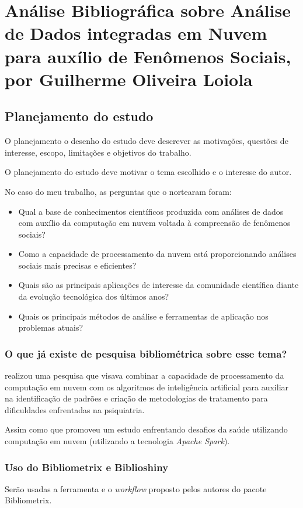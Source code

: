 \chapter{Análise Bibliográfica sobre Análise de Dados integradas em Nuvem para auxílio de Fenômenos Sociais, por Guilherme Oliveira Loiola\label{chap:bibliometria:guioliunb}}

\section{Planejamento do estudo\label{MASSA:coleta}}
O planejamento o  desenho do estudo deve descrever as motivações, questões de interesse, escopo, limitações e objetivos do trabalho.

O planejamento do estudo deve motivar o tema escolhido e o interesse do autor.

No caso do meu trabalho, as perguntas que o nortearam foram:
\begin{itemize}
    \item Qual a base de conhecimentos científicos produzida com análises de dados com auxílio da computação em nuvem voltada à compreensão de fenômenos sociais? 
    \item Como a capacidade de processamento da nuvem está proporcionando análises sociais mais precisas e eficientes? 
    \item Quais são as principais aplicações de interesse da comunidade científica diante da evolução tecnológica dos últimos anos?
    \item Quais os principais métodos de análise e ferramentas de aplicação nos problemas atuais?
\end{itemize}

\subsection{O que já existe de pesquisa bibliométrica sobre esse tema?}

\cite{ma_method_2020} realizou uma pesquisa que visava combinar a capacidade de processamento da computação em nuvem com os algoritmos de inteligência artificial para auxiliar na identificação de padrões e criação de metodologias de tratamento para dificuldades enfrentadas na psiquiatria.

Assim como \cite{archenaa_interactive_2016} que promoveu um estudo enfrentando desafios da saúde utilizando computação em nuvem (utilizando a tecnologia \textit{Apache Spark}).


\subsection{Uso do Bibliometrix e Biblioshiny}
Serão usadas a ferramenta e o \textit{workflow} proposto pelos autores do pacote Bibliometrix.

